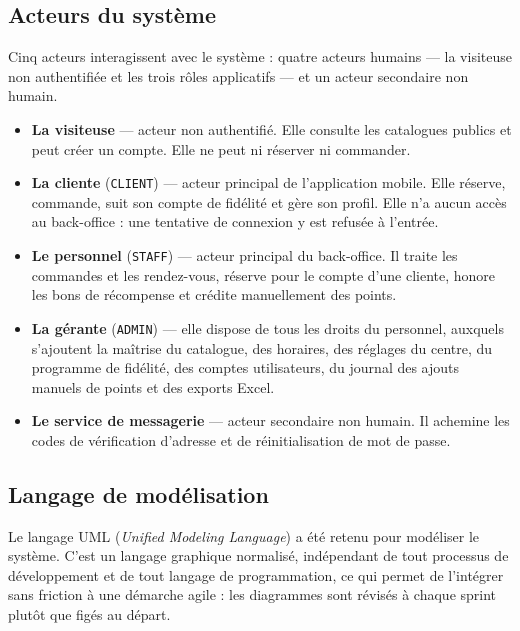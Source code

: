 \subsection{Acteurs du système}

Cinq acteurs interagissent avec le système : quatre acteurs humains --- la
visiteuse non authentifiée et les trois rôles applicatifs --- et un acteur
secondaire non humain.

\begin{itemize}[leftmargin=1.2cm]
  \item \textbf{La visiteuse} --- acteur non authentifié. Elle consulte les
  catalogues publics et peut créer un compte. Elle ne peut ni réserver ni
  commander.

  \item \textbf{La cliente} (\texttt{CLIENT}) --- acteur principal de
  l'application mobile. Elle réserve, commande, suit son compte de fidélité et
  gère son profil. Elle n'a aucun accès au back-office : une tentative de
  connexion y est refusée à l'entrée.

  \item \textbf{Le personnel} (\texttt{STAFF}) --- acteur principal du
  back-office. Il traite les commandes et les rendez-vous, réserve pour le
  compte d'une cliente, honore les bons de récompense et crédite manuellement
  des points.

  \item \textbf{La gérante} (\texttt{ADMIN}) --- elle dispose de tous les
  droits du personnel, auxquels s'ajoutent la maîtrise du catalogue, des
  horaires, des réglages du centre, du programme de fidélité, des comptes
  utilisateurs, du journal des ajouts manuels de points et des exports Excel.

  \item \textbf{Le service de messagerie} --- acteur secondaire non humain. Il
  achemine les codes de vérification d'adresse et de réinitialisation de mot de
  passe.
\end{itemize}

\subsection{Langage de modélisation}

Le langage UML (\textit{Unified Modeling Language}) a été retenu pour
modéliser le système. C'est un langage graphique normalisé, indépendant de tout
processus de développement et de tout langage de programmation, ce qui permet
de l'intégrer sans friction à une démarche agile : les diagrammes sont révisés
à chaque sprint plutôt que figés au départ.

